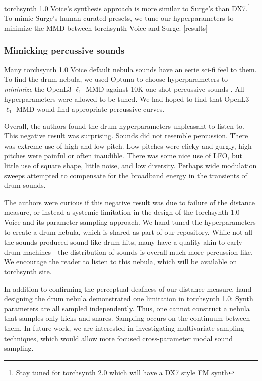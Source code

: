 torchsynth 1.0 Voice's synthesis approach is more similar to Surge's than DX7.\footnote{Stay tuned for torchsynth 2.0 which will have a DX7 style FM synth}
To mimic Surge's human-curated presets, we tune our hyperparameters to minimize the MMD between torchsynth Voice and Surge. [results]

\subsubsection{Mimicking percussive sounds}
\fi

Many torchsynth 1.0 Voice default nebula sounds have an eerie sci-fi feel to them.
To find the drum nebula, we used Optuna to choose hyperparameters to {\em minimize} the OpenL3-$\ell_1$-MMD against 10K one-shot percussive sounds \cite{ramires2020}. All hyperparameters were allowed to be tuned.
We had hoped to find that OpenL3-$\ell_1$-MMD would find appropriate percussive curves.

Overall, the authors found the drum hyperparameters unpleasant to listen to. This negative result was surprising. Sounds did not resemble percussion. There was extreme use of high and low pitch. Low pitches were clicky and gurgly, high pitches were painful or often inaudible. There was some nice use of LFO, but little use of square shape, little noise, and low diversity. Perhaps wide modulation sweeps attempted to compensate for the broadband energy in the transients of drum sounds.

The authors were curious if this negative result was due to failure of the distance measure, or instead a systemic limitation in the design of the torchsynth 1.0 Voice and its parameter sampling approach. We hand-tuned the hyperparameters to create a drum nebula, which is shared as part of our repository. While not all the sounds produced sound like drum hits, many have a quality akin to early drum machines---the distribution of sounds is overall much more percussion-like. We encourage the reader to listen to this nebula, which will be available on torchsynth site.

In addition to confirming the perceptual-deafness of our distance measure, hand-designing the drum nebula demonstrated one limitation in torchsynth 1.0: Synth parameters are all sampled independently. Thus, one cannot construct a nebula that samples only kicks and snares. Sampling occurs on the continuum between them. In future work, we are interested in investigating multivariate sampling techniques, which would allow more focused cross-parameter modal sound sampling.

